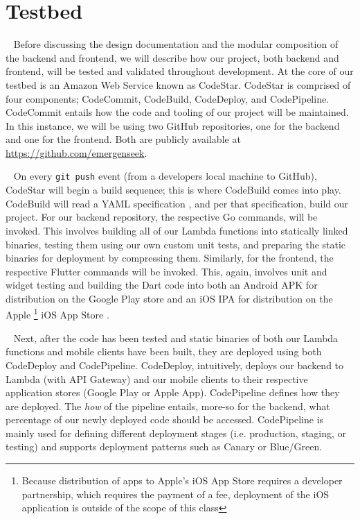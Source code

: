 \documentclass[10pt, a4paper]{article}
\begin{document}
\section{Testbed}
\par ~ Before discussing the design documentation and the modular composition of the backend and frontend, we will describe how our project, both backend and frontend, will be tested and validated throughout development. At the core of our testbed is an Amazon Web Service known as CodeStar. CodeStar is comprised of four components; CodeCommit, CodeBuild, CodeDeploy, and CodePipeline. CodeCommit entails how the code and tooling of our project will be maintained. In this instance, we will be using two GitHub repositories, one for the backend and one for the frontend. Both are publicly available at \url{https://github.com/emergenseek}. 

\par ~ On every \texttt{git push} event (from a developers local machine to GitHub), CodeStar will begin a build sequence; this is where CodeBuild comes into play. CodeBuild will read a YAML specification \cite{two}, and per that specification, build our project. For our backend repository, the respective Go commands, will be invoked. This involves building all of our Lambda functions into statically linked binaries, testing them using our own custom unit tests, and preparing the static binaries for deployment by compressing them. Similarly, for the frontend, the respective Flutter commands will be invoked. This, again, involves unit and widget testing \cite{three} and building the Dart code into both an Android APK \cite{four} for distribution on the Google Play store and an iOS IPA for distribution on the Apple \footnote{Because distribution of apps to Apple's iOS App Store requires a developer partnership, which requires the payment of a fee, deployment of the iOS application is outside of the scope of this class} iOS App Store .

\par ~ Next, after the code has been tested and static binaries of both our Lambda functions and mobile clients have been built, they are deployed using both CodeDeploy and CodePipeline. CodeDeploy, intuitively, deploys our backend to Lambda (with API Gateway) and our mobile clients to their respective application stores (Google Play or Apple App). CodePipeline defines how they are deployed. The \emph{how} of the pipeline entails, more-so for the backend, what percentage of our newly deployed code should be accessed. CodePipeline is mainly used for defining different deployment stages (i.e. production, staging, or testing) and supports deployment patterns such as Canary or Blue/Green. 
\end{document}
